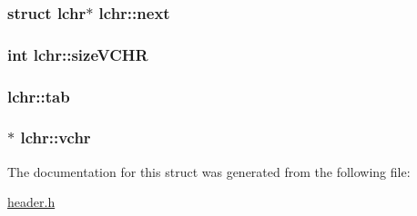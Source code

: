 \subsubsection[{next}]{\setlength{\rightskip}{0pt plus 5cm}struct {\bf lchr}$\ast$ lchr\+::next}\label{structlchr_a199de28f3696502a144d0700a71079af}
\hypertarget{structlchr_adfe0095d4e23d67ecbc070b08847134f}{}
\subsubsection[{size\+V\+C\+H\+R}]{\setlength{\rightskip}{0pt plus 5cm}int lchr\+::size\+V\+C\+H\+R}\label{structlchr_adfe0095d4e23d67ecbc070b08847134f}
\hypertarget{structlchr_a7a7d388281d331e5edc210408c120f7d}{}
\subsubsection[{tab}]{ lchr\+::tab}\label{structlchr_a7a7d388281d331e5edc210408c120f7d}
\hypertarget{structlchr_aeebc6baee26889679cfb6db05f8f1c00}{}
\subsubsection[{vchr}]{$\ast$ lchr\+::vchr}\label{structlchr_aeebc6baee26889679cfb6db05f8f1c00}


The documentation for this struct was generated from the following file\+:\begin{DoxyCompactItemize}
\item 
\hyperlink{header_8h}{header.\+h}\end{DoxyCompactItemize}
